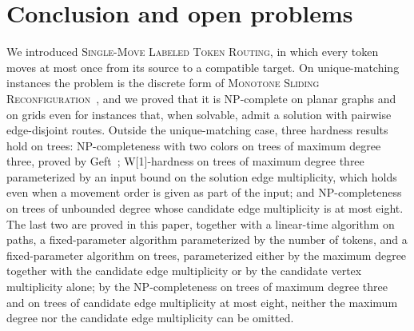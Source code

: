 \documentclass[a4paper,USenglish,thm-restate]{lipics-v2021}
\theoremstyle{problemstyle}
\begin{document}
\section{Conclusion and open problems}
\label{sec:conclusion}
 
We introduced \textsc{Single-Move Labeled Token Routing}, in which every
token moves at most once from its source to a compatible target. On
unique-matching instances the problem is the discrete form of
\textsc{Monotone Sliding Reconfiguration}~\cite{GeftHalperinNakar2024}, and we proved
that it is \textsf{NP}-complete on planar graphs and on grids even for instances
that, when solvable, admit a solution with pairwise edge-disjoint routes.
Outside the unique-matching case, three hardness results hold
on trees: \textsf{NP}-completeness with two colors on trees of maximum degree
three, proved by Geft~\cite{Geft2026Trees}; \textsf{W}[1]-hardness on trees of maximum
degree three parameterized by an input bound on the solution edge
multiplicity, which holds even when a movement order is given as part of
the input; and \textsf{NP}-completeness on trees of unbounded degree whose
candidate edge multiplicity is at most eight. The last two are proved in
this paper, together with a linear-time algorithm on paths, a
fixed-parameter algorithm parameterized by the number of tokens, and a
fixed-parameter algorithm on trees, parameterized either by the maximum
degree together with the candidate edge multiplicity or by the candidate
vertex multiplicity alone; by the \textsf{NP}-completeness on trees of
maximum degree three and on trees of candidate edge multiplicity at most
eight, neither the maximum degree nor the candidate edge multiplicity can
be omitted.
 
\end{document}
